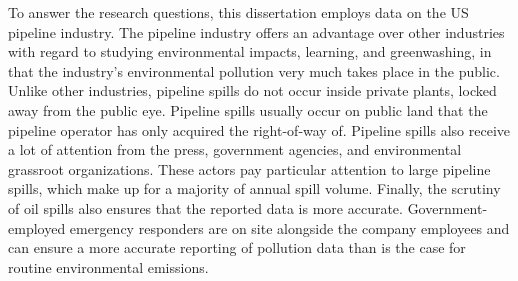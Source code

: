 
To answer the research questions, this dissertation employs data on the US pipeline industry. The pipeline industry offers an advantage over other industries with regard to studying environmental impacts, learning, and greenwashing, in that the industry's environmental pollution very much takes place in the public. Unlike other industries, pipeline spills do not occur inside private plants, locked away from the public eye. Pipeline spills usually occur on public land that the pipeline operator has only acquired the right-of-way of. Pipeline spills also receive a lot of attention from the press, government agencies, and environmental grassroot organizations. These actors pay particular attention to large pipeline spills, which make up for a majority of annual spill volume. Finally, the scrutiny of oil spills also ensures that the reported data is more accurate. Government-employed emergency responders are on site alongside the company employees and can ensure a more accurate reporting of pollution data than is the case for routine environmental emissions.

